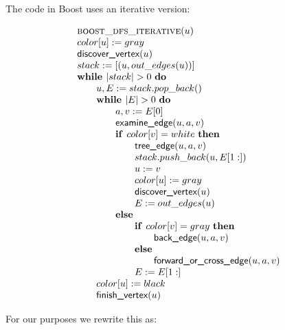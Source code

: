 \documentclass{article}
\newcommand{\Space}{\text{\ }}
\newcommand{\If}{\text{\textbf{if }}}
\newcommand{\Do}{\text{\textbf{do }}}
\newcommand{\Then}{\text{\textbf{then }}}
\newcommand{\Else}{\text{\textbf{else }}}
\newcommand{\While}{\text{\textbf{while }}}
\begin{document}
The code in Boost uses an iterative version:

\[
\begin{tabular}{l}
\textsc{boost\_dfs\_iterative}($u$) \\
$color[u] := gray$ \\
$\textsf{discover\_vertex}(u)$ \\
$stack := [(u, out\_edges(u))]$ \\
$\While |stack| > 0 \Space \Do$ \\
\qquad $u, E := stack.pop\_back()$ \\
\qquad $\While |E| > 0 \Space \Do$ \\
\qquad \qquad $a, v := E[0]$ \\
\qquad \qquad $\textsf{examine\_edge}(u, a, v)$ \\
\qquad \qquad $\If color[v] = white \Space \Then$ \\
\qquad \qquad \qquad $\textsf{tree\_edge}(u, a, v)$ \\
\qquad \qquad \qquad $stack.push\_back(u, E[1:])$ \\
\qquad \qquad \qquad $u := v$ \\
\qquad \qquad \qquad $color[u] := gray$ \\
\qquad \qquad \qquad $\textsf{discover\_vertex}(u)$ \\
\qquad \qquad \qquad $E := out\_edges(u)$ \\
\qquad \qquad \Else \\
\qquad \qquad \qquad $\If color[v] = gray \Space \Then$ \\
\qquad \qquad \qquad \qquad $\textsf{back\_edge}(u, a, v)$ \\
\qquad \qquad \qquad \Else \\
\qquad \qquad \qquad \qquad $\textsf{forward\_or\_cross\_edge}(u, a, v)$ \\
\qquad \qquad \qquad $E := E[1:]$ \\
\qquad $color[u] := black$ \\
\qquad $\textsf{finish\_vertex}(u)$ \\
\end{tabular}
\]

For our purposes we rewrite this as:
\end{document}
